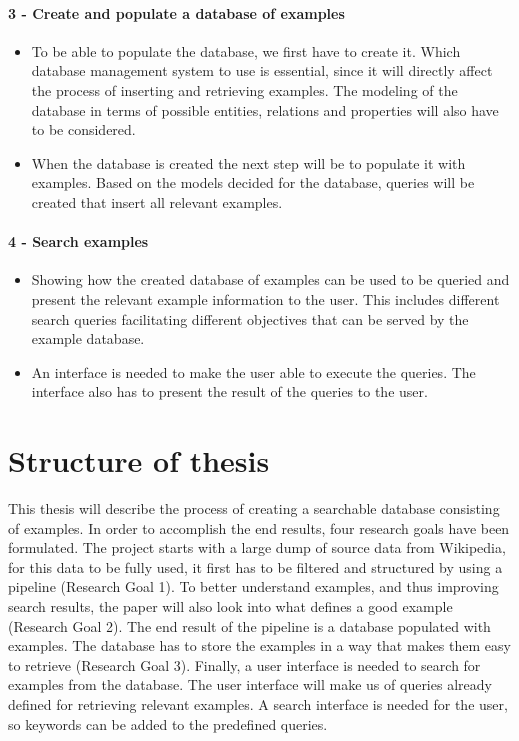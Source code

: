 \paragraph{3 - Create and populate a database of examples}
\begin{itemize}
    \item To be able to populate the database, we first have to create it. Which database management system to use is essential, since it will directly affect the process of inserting and retrieving examples. The modeling of the database in terms of possible entities, relations and properties will also have to be considered.
    \item When the database is created the next step will be to populate it with examples. Based on the models decided for the database, queries will be created that insert all relevant examples.
\end{itemize}


\paragraph{4 - Search examples }
\begin{itemize}
    \item Showing how the created database of examples can be used to be queried and present the relevant example information to the user. This includes different search queries facilitating different objectives that can be served by the example database.
    \item An interface is needed to make the user able to execute the queries. The interface also has to present the result of the queries to the user.
\end{itemize}


\section{Structure of thesis}
This thesis will describe the process of creating a searchable database consisting of examples. In order to accomplish the end results, four research goals have been formulated. The project starts with a large dump of source data from Wikipedia, for this data to be fully used, it first has to be filtered and structured by using a pipeline (Research Goal 1). To better understand examples, and thus improving search results, the paper will also look into what defines a good example (Research Goal 2). The end result of the pipeline is a database populated with examples. The database has to store the examples in a way that makes them easy to retrieve (Research Goal 3). Finally, a user interface is needed to search for examples from the database. The user interface will make us of queries already defined for retrieving relevant examples. A search interface is needed for the user, so keywords can be added to the predefined queries.

